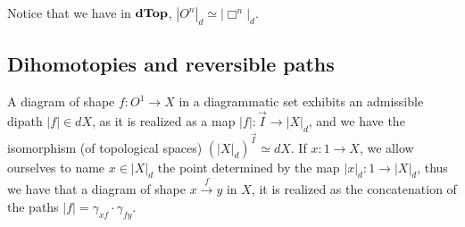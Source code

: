 Notice that we have in \( \mathbf{dTop} \), \( |O^n|_d \simeq |\Box^n|_d \).



\subsection{Dihomotopies and reversible paths}
A diagram of shape \( f : O^1 \to X \) in a diagrammatic set exhibits an admissible dipath \( |f| \in dX \), as it is realized as a map \( |f| : \vec{I} \to |X|_d \), and we have the isomorphism (of topological spaces) \( (|X|_d)^{\vec{I}} \simeq dX \). If \( x : 1 \to X \), we allow ourselves to name \( x \in |X|_d \) the point determined by the map \( |x|_d : 1 \to |X|_d \), thus we have that a diagram of shape \( x \stackrel{f}{\to} y \) in \( X \), it is realized as the concatenation of the paths \( |f| = \gamma_{xf}\cdot\gamma_{fy} \).

